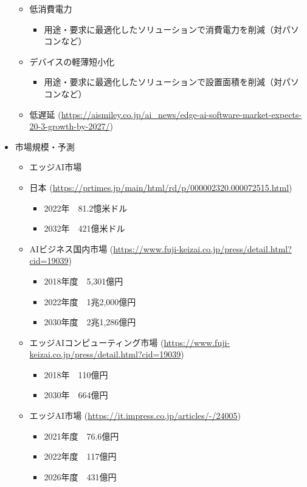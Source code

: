 \begin{itemize}
\begin{itemize}
\begin{itemize}
		\end{itemize}
		\item 低消費電力
		\begin{itemize}
			\item 用途・要求に最適化したソリューションで消費電力を削減（対パソコンなど）
		\end{itemize}
		\item デバイスの軽薄短小化
		\begin{itemize}
			\item 用途・要求に最適化したソリューションで設置面積を削減（対パソコンなど）
		\end{itemize}
		\item 低遅延 (\url{https://aismiley.co.jp/ai_news/edge-ai-software-market-expects-20-3-growth-by-2027/})
	\end{itemize}
	\item 市場規模・予測
	\begin{itemize}
		\item エッジAI市場
			\item 日本 (\url{https://prtimes.jp/main/html/rd/p/000002320.000072515.html})
			\begin{itemize}
				\item 2022年　81.2憶米ドル
				\item 2032年　421億米ドル
			\end{itemize}
			\item AIビジネス国内市場 (\url{https://www.fuji-keizai.co.jp/press/detail.html?cid=19039})
			\begin{itemize}
				\item 2018年度　5,301億円
				\item 2022年度　1兆2,000億円
				\item 2030年度　2兆1,286億円
			\end{itemize}
			\item エッジAIコンピューティング市場 (\url{https://www.fuji-keizai.co.jp/press/detail.html?cid=19039})
			\begin{itemize}
				\item 2018年　110億円
				\item 2030年　664億円
			\end{itemize}
			\item エッジAI市場 (\url{https://it.impress.co.jp/articles/-/24005})
			\begin{itemize}
				\item 2021年度　76.6億円
				\item 2022年度　117億円
				\item 2026年度　431億円

\end{itemize}
\end{itemize}
\end{itemize}

